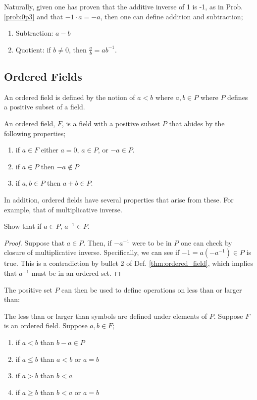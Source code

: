 Naturally, given one has proven that the additive inverse of 1 is -1, as in Prob. \ref{prob:0p3} and that $-1 \cdot a = -a$, then one can define addition and subtraction;
\begin{enumerate}
\item Subtraction: $a-b$
\item Quotient: if $b\neq 0$, then $\frac{a}{b} = a b^{-1}$.
\end{enumerate}

\subsection{Ordered Fields}

An ordered field is defined by the notion of $a < b$ where $a,b \in P$ where $P$ defines a positive subset of a field. 

\begin{definition}\label{thm:ordered_field}
    An ordered field, $F$, is a field with a positive subset $P$ that abides by the following properties;
    \begin{enumerate}
        \item if $a \in F$ either $a=0$, $a \in P$, or $-a \in P$.
        \item if $a \in P$ then $-a \notin P$
        \item if $a,b \in P$ then $a + b \in P$.
    \end{enumerate}
\end{definition}

In addition, ordered fields have several properties that arise from these. For example, that of multiplicative inverse.
\begin{problem}
    Show that if $a\in P$, $a^{-1} \in P$.
\end{problem}
\begin{proof}
    Suppose that $a\in P$. Then, if $-a^{-1}$ were to be in $P$ one can check by closure of multiplicative inverse. Specifically, we can see if $-1 = a(-a^{-1}) \in P$ is true. This is a contradiction by bullet 2 of Def. \ref{thm:ordered_field}, which implies that $a^{-1}$ must be in an ordered set.
\end{proof}

The positive set $P$ can then be used to define operations on less than or larger than:
\begin{definition}
    The less than or larger than symbols are defined under elements of $P$. Suppose $F$ is an ordered field. Suppose $a,b \in F$;
    \begin{enumerate}
        \item if $ a < b$ than $b-a \in P$
        \item if $a\leq b$ than $a < b$ or $a = b$
        \item if $ a > b$ than $ b < a$
        \item if $a \geq b$ than $b < a$ or $a = b$
    \end{enumerate} 
\end{definition}

